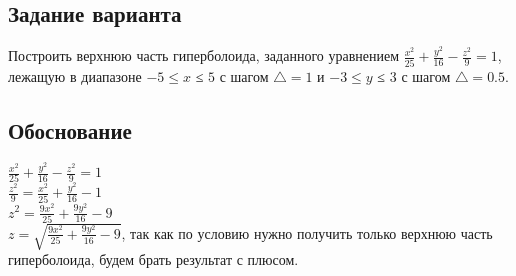 \documentclass[a4paper, 12pt, oneside]{article}
\begin{document}
    \subsection{Задание варианта}
    Построить верхнюю часть гиперболоида, заданного уравнением $\frac{x^2}{25} + \frac{y^2}{16} - \frac{z^2}{9} = 1$,
    лежащую в диапазоне $-5 \leq x $ ≤ $ 5$ с шагом $\triangle = 1$ и $-3 \leq y $ ≤ $ 3$ с шагом $\triangle = 0.5$.

    \subsection{Обоснование}
    $\frac{x^2}{25} + \frac{y^2}{16} - \frac{z^2}{9} = 1$\\
    $\frac{z^2}{9} = \frac{x^2}{25} + \frac{y^2}{16} - 1$\\
    $z^2 = \frac{9x^2}{25} + \frac{9y^2}{16} - 9$\\
    $z = \sqrt{\frac{9x^2}{25} + \frac{9y^2}{16} - 9}$, так как по условию нужно получить только верхнюю часть гиперболоида,
    будем брать результат с плюсом.
\end{document}
